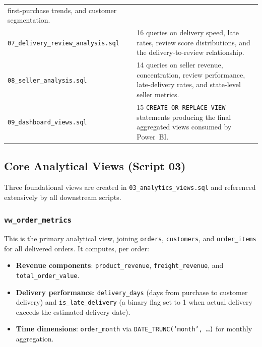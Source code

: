 \documentclass[12pt,a4paper]{article}
\begin{document}
\begin{table}[H]
\begin{tabular}{lp{9.5cm}}
                                                          first-purchase trends, and customer segmentation. \\
        \texttt{07\_delivery\_review\_analysis.sql}    & 16 queries on delivery speed, late rates, review score
                                                          distributions, and the delivery-to-review relationship. \\
        \texttt{08\_seller\_analysis.sql}         & 14 queries on seller revenue, concentration, review
                                                     performance, late-delivery rates, and state-level seller metrics. \\
        \texttt{09\_dashboard\_views.sql}         & 15 \texttt{CREATE OR REPLACE VIEW} statements producing
                                                     the final aggregated views consumed by Power~BI. \\
        \bottomrule
    \end{tabular}
\end{table}

\subsection{Core Analytical Views (Script 03)}

Three foundational views are created in \texttt{03\_analytics\_views.sql} and referenced
extensively by all downstream scripts.

\subsubsection{\texttt{vw\_order\_metrics}}

This is the primary analytical view, joining \texttt{orders}, \texttt{customers}, and
\texttt{order\_items} for all delivered orders. It computes, per order:

\begin{itemize}
    \item \textbf{Revenue components}: \texttt{product\_revenue}, \texttt{freight\_revenue},
          and \texttt{total\_order\_value}.
    \item \textbf{Delivery performance}: \texttt{delivery\_days} (days from purchase to
          customer delivery) and \texttt{is\_late\_delivery} (a binary flag set to 1 when
          actual delivery exceeds the estimated delivery date).
    \item \textbf{Time dimensions}: \texttt{order\_month} via
          \texttt{DATE\_TRUNC('month', \ldots)} for monthly aggregation.
\end{itemize}
\end{document}
